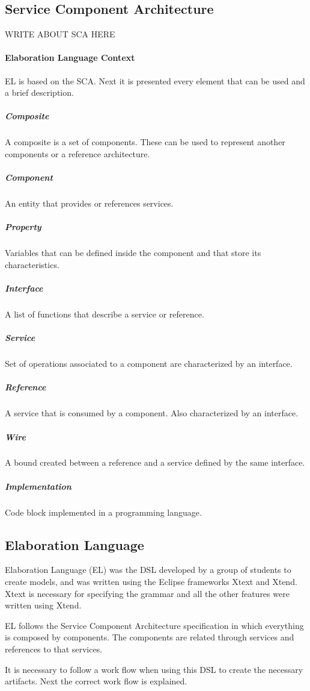 \documentclass{report}
\begin{document}
		\subsection{Service Component Architecture}
		
		\par WRITE ABOUT SCA HERE
		
		\paragraph{Elaboration Language Context} EL is based on the SCA. Next it is presented every element that can be used and a brief description.
		
			\subparagraph{Composite} A composite is a set of components. These can be used to represent another components or a reference architecture.
		
			\subparagraph{Component} An entity that provides or references services. 
		
			\subparagraph{Property} Variables that can be defined inside the component and that store its characteristics. 
		
			\subparagraph{Interface} A list of functions that describe a service or reference.
		
			\subparagraph{Service} Set of operations associated to a component are characterized by an interface. 
		
			\subparagraph{Reference} A service that is consumed by a component. Also characterized by an interface.
		
			\subparagraph{Wire} A bound created between a reference and a service defined by the same interface.
		
			\subparagraph{Implementation} Code block implemented in a programming language.
		
		\subsection{Elaboration Language}
		
		\par Elaboration Language (EL) was the DSL developed by a group of students to create models, and was written using the Eclipse frameworks Xtext and Xtend. Xtext is necessary for specifying the grammar and all the other features were written using Xtend. 
		\par EL follows the Service Component Architecture specification in which everything is composed by components. The components are related through services and references to that services. 
		\par It is necessary to follow a work flow when using this DSL to create the necessary artifacts. Next the correct work flow is explained.
\end{document}
